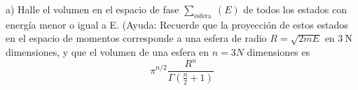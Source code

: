 a) Halle el volumen en el espacio de fase $\sum_{\text {esfera }}(E)$ de todos los estados con energía menor o igual a E. (Ayuda: Recuerde que la proyección de estos estados en el espacio de momentos corresponde a una esfera de radio $R=\sqrt{2 m E}$ en $3 \mathrm{~N}$ dimensiones, y que el volumen de una esfera en $n=3 N$ dimensiones es
$$
\pi^{n / 2} \frac{R^n}{\Gamma\left(\frac{n}{2}+1\right)}
$$